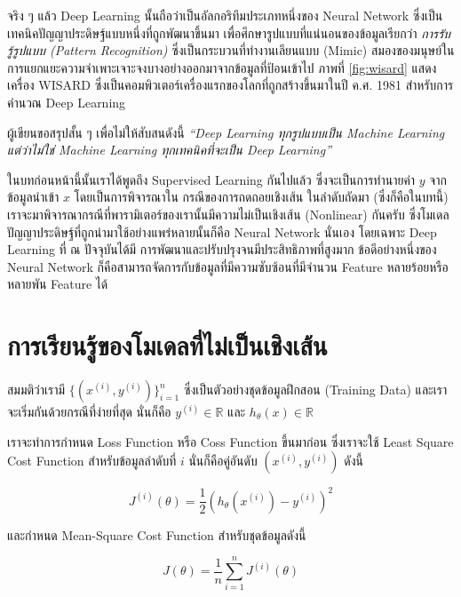 จริง ๆ แล้ว Deep Learning นั้นถือว่าเป็นอัลกอริทึมประเภทหนึ่งของ Neural Network ซึ่งเป็นเทคนิคปัญญาประดิษฐ์แบบหนึ่งที่ถูกพัฒนาขึ้นมา%
เพื่อศึกษารูปแบบที่แน่นอนของข้อมูลเรียกว่า \textit{การรับรู้รูปแบบ (Pattern Recognition)} ซึ่งเป็นกระบวนที่ทำงานเลียนแบบ (Mimic)
สมองของมนุษย์ในการแยกแยะความจำเพาะเจาะจงบางอย่างออกมาจากข้อมูลที่ป้อนเข้าไป ภาพที่ \ref{fig:wisard} แสดงเครื่อง WISARD
ซึ่งเป็นคอมพิวเตอร์เครื่องแรกของโลกที่ถูกสร้างขึ้นมาในปี ค.ศ. 1981 สำหรับการคำนวณ Deep Learning

ผู้เขียนขอสรุปสั้น ๆ เพื่อไม่ให้สับสนดังนี้ \textit{\enquote{Deep Learning ทุกรูปแบบเป็น Machine Learning แต่ว่าไม่ใช่ Machine
        Learning ทุกเทคนิคที่จะเป็น Deep Learning}}

ในบทก่อนหน้านี้นั้นเราได้พูดถึง Supervised Learning กันไปแล้ว ซึ่งจะเป็นการทำนายค่า $y$ จากข้อมูลนำเข้า $x$ โดยเป็นการพิจารณาใน%
กรณีของการถดถอยเชิงเส้น ในลำดับถัดมา (ซึ่งก็คือในบทนี้) เราจะมาพิจารณากรณีที่พารามิเตอร์ของเรานั้นมีความไม่เป็นเชิงเส้น (Nonlinear)
กันครับ ซึ่งโมเดลปัญญาประดิษฐ์ที่ถูกนำมาใช้อย่างแพร่หลายนั้นก็คือ Neural Network นั่นเอง โดยเฉพาะ Deep Learning ที่ ณ ปัจจุบันได้มี%
การพัฒนาและปรับปรุงจนมีประสิทธิภาพที่สูงมาก ข้อดีอย่างหนึ่งของ Neural Network ก็คือสามารถจัดการกับข้อมูลที่มีความซับซ้อนที่มีจำนวน
Feature หลายร้อยหรือหลายพัน Feature ได้

\section{การเรียนรู้ของโมเดลที่ไม่เป็นเชิงเส้น}
\label{sec:nonlinear_ml}

สมมติว่าเรามี $\{(x^{(i)}, y^{(i)})\}^n_{i=1}$ ซึ่งเป็นตัวอย่างชุดข้อมูลฝึกสอน (Training Data) และเราจะเริ่มกันด้วยกรณีที่ง่ายที่สุด%
นั่นก็คือ $y^{(i)} \in \mathbb{R}$ และ $h_\theta(x) \in \mathbb{R}$

เราจะทำการกำหนด Loss Function หรือ Coss Function ขึ้นมาก่อน ซึ่งเราจะใช้ Least Square Cost Function สำหรับข้อมูลลำดับที่ $i$
นั่นก็คือคู่อันดับ $(x^{(i)} ,y^{(i)})$ ดังนี้

\begin{equation}\label{eq:loss}
    J^{(i)} (\theta) = \frac{1}{2} \left(h_\theta (x^{(i)}) - y^{(i)}\right)^2
\end{equation}

\noindent และกำหนด Mean-Square Cost Function สำหรับชุดข้อมูลดังนี้

\begin{equation}\label{eq:mse_loss}
    J(\theta) = \frac 1 n \sum_{i=1}^n J^{(i)}(\theta)
\end{equation}

